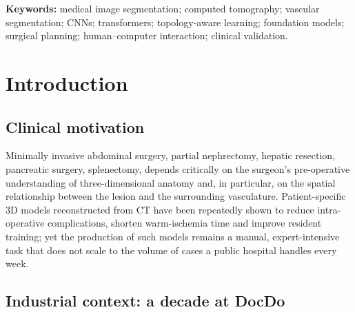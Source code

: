 \documentclass[a4paper,11pt,twoside]{article}
\begin{document}
\medskip\noindent
\textbf{Keywords:} medical image segmentation; computed tomography; vascular
segmentation; CNNs; transformers; topology-aware learning; foundation
models; surgical planning; human--computer interaction; clinical validation.

\newpage
\tableofcontents
\newpage

\section{Introduction}

\subsection{Clinical motivation}

Minimally invasive abdominal surgery, partial nephrectomy, hepatic
resection, pancreatic surgery, splenectomy, depends critically on the
surgeon's pre-operative understanding of three-dimensional anatomy and, in
particular, on the spatial relationship between the lesion and the surrounding
vasculature. Patient-specific 3D models reconstructed from CT have been
repeatedly shown to reduce intra-operative complications, shorten warm-ischemia
time and improve resident training; yet the production of such models remains
a manual, expert-intensive task that does not scale to the volume of cases a
public hospital handles every week.

\subsection{Industrial context: a decade at DocDo}
\end{document}
